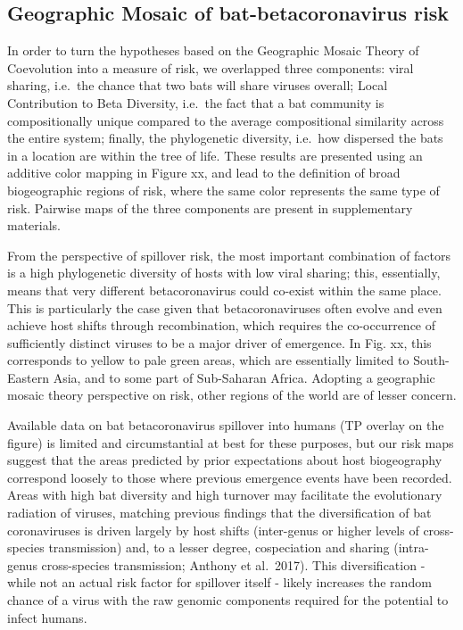 \documentclass[10pt,oneside]{article}
\begin{document}
\hypertarget{geographic-mosaic-of-bat-betacoronavirus-risk}{%
\subsection{Geographic Mosaic of bat-betacoronavirus
risk}\label{geographic-mosaic-of-bat-betacoronavirus-risk}}

In order to turn the hypotheses based on the Geographic Mosaic Theory of
Coevolution into a measure of risk, we overlapped three components:
viral sharing, i.e.~the chance that two bats will share viruses overall;
Local Contribution to Beta Diversity, i.e.~the fact that a bat community
is compositionally unique compared to the average compositional
similarity across the entire system; finally, the phylogenetic
diversity, i.e.~how dispersed the bats in a location are within the tree
of life. These results are presented using an additive color mapping in
Figure xx, and lead to the definition of broad biogeographic regions of
risk, where the same color represents the same type of risk. Pairwise
maps of the three components are present in supplementary materials.

From the perspective of spillover risk, the most important combination
of factors is a high phylogenetic diversity of hosts with low viral
sharing; this, essentially, means that very different betacoronavirus
could co-exist within the same place. This is particularly the case
given that betacoronaviruses often evolve and even achieve host shifts
through recombination, which requires the co-occurrence of sufficiently
distinct viruses to be a major driver of emergence. In Fig. xx, this
corresponds to yellow to pale green areas, which are essentially limited
to South-Eastern Asia, and to some part of Sub-Saharan Africa. Adopting
a geographic mosaic theory perspective on risk, other regions of the
world are of lesser concern.

Available data on bat betacoronavirus spillover into humans (TP overlay
on the figure) is limited and circumstantial at best for these purposes,
but our risk maps suggest that the areas predicted by prior expectations
about host biogeography correspond loosely to those where previous
emergence events have been recorded. Areas with high bat diversity and
high turnover may facilitate the evolutionary radiation of viruses,
matching previous findings that the diversification of bat coronaviruses
is driven largely by host shifts (inter-genus or higher levels of
cross-species transmission) and, to a lesser degree, cospeciation and
sharing (intra-genus cross-species transmission; Anthony et al.~2017).
This diversification - while not an actual risk factor for spillover
itself - likely increases the random chance of a virus with the raw
genomic components required for the potential to infect humans.
\end{document}
